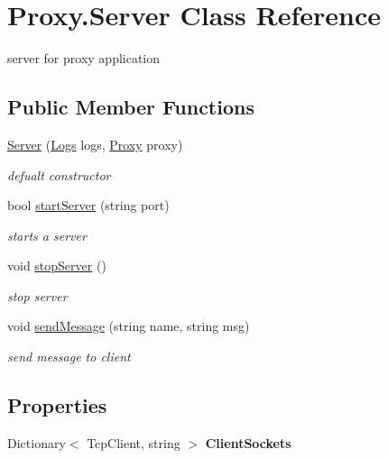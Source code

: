 \hypertarget{class_proxy_1_1_server}{}\section{Proxy.\+Server Class Reference}
\label{class_proxy_1_1_server}


server for proxy application  


\subsection*{Public Member Functions}
\begin{DoxyCompactItemize}
\item 
\hyperlink{class_proxy_1_1_server_ac68f887c11aa8b413cfcb6b0577f720e}{Server} (\hyperlink{class_proxy_1_1_logs}{Logs} logs, \hyperlink{class_proxy_1_1_proxy}{Proxy} proxy)
\begin{DoxyCompactList}\small\item\em defualt constructor \end{DoxyCompactList}\item 
bool \hyperlink{class_proxy_1_1_server_ac99fd2d1dbd9bee2cb0bab251bb67112}{start\+Server} (string port)
\begin{DoxyCompactList}\small\item\em starts a server \end{DoxyCompactList}\item 
void \hyperlink{class_proxy_1_1_server_a2968d12c76a5d4a28f2552b9ce59c2b9}{stop\+Server} ()
\begin{DoxyCompactList}\small\item\em stop server \end{DoxyCompactList}\item 
void \hyperlink{class_proxy_1_1_server_a8cbf64be965e0b25a59237972ebb9daa}{send\+Message} (string name, string msg)
\begin{DoxyCompactList}\small\item\em send message to client \end{DoxyCompactList}\end{DoxyCompactItemize}
\subsection*{Properties}
\begin{DoxyCompactItemize}
\item 
\hypertarget{class_proxy_1_1_server_aaf68769d3196afe2dbbb199100e63730}{}Dictionary$<$ Tcp\+Client, string $>$ {\bfseries Client\+Sockets}\label{class_proxy_1_1_server_aaf68769d3196afe2dbbb199100e63730}

\end{DoxyCompactItemize}


